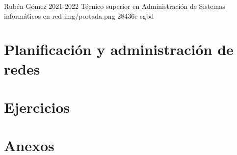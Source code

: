 \documentclass{../../../yukibook.cls/yukibook}
\begin{document}
    {Rubén Gómez}  %
    {2021-2022}    %
    {Técnico superior en Administración de \linebreak Sistemas informáticos en red} %
    {}	%
    {}	%
    {img/portada.png} %
    {28436c}
    {sgbd} %

    \part{Planificación y administración de redes}
    \graphicspath{{img/redes/}}
    

    \part{Ejercicios}
    

    \part{Anexos}

    

    \graphicspath{{../../../anexos/instalar_ubuntu_lts/}}
    

    \graphicspath{{../../../anexos/virtualbox_networking/}}
    
    \graphicspath{{../../../anexos/}}
    
\end{document}
